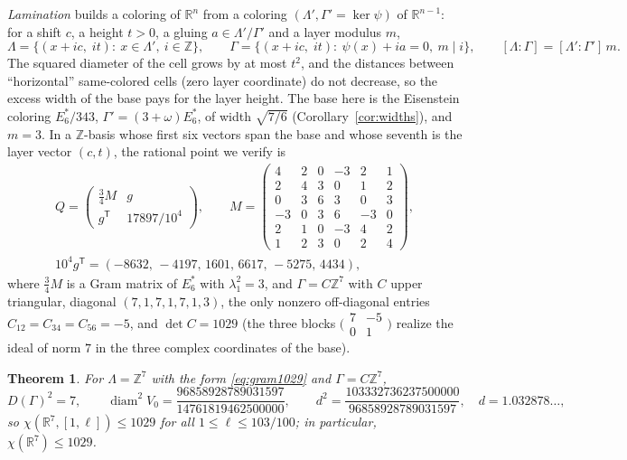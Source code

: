 \documentclass[10pt]{article}
\theoremstyle{plain}
\newtheorem{theorem}{Theorem}[section]
\theoremstyle{remark}
\newcommand{\R}{\mathbb{R}}
\newcommand{\Z}{\mathbb{Z}}
\newcommand{\diam}{\operatorname{diam}}
\begin{document}
\emph{Lamination} builds a coloring of $\R^{n}$ from a coloring
$(\Lambda',\Gamma'=\ker\psi)$ of $\R^{n-1}$: for a shift $c$, a height $t>0$,
a gluing $a\in\Lambda'/\Gamma'$ and a layer modulus $m$,
\[
\Lambda=\bigl\{(x+ic,\;it):\ x\in\Lambda',\ i\in\Z\bigr\},\qquad
\Gamma=\bigl\{(x+ic,\;it):\ \psi(x)+ia=0,\ m\mid i\bigr\},\qquad
[\Lambda:\Gamma]=[\Lambda':\Gamma']\,m .
\]
The squared diameter of the cell grows by at most $t^2$, and the distances
between ``horizontal'' same-colored cells (zero layer coordinate) do not
decrease, so the excess width of the base pays for the layer height. The
base here is the Eisenstein coloring $E_6^*/343$, $\Gamma'=(3+\omega)E_6^*$,
of width $\sqrt{7/6}$ (Corollary~\ref{cor:widths}), and $m=3$. In a
$\Z$-basis whose first six vectors span the base and whose seventh is the
layer vector $(c,t)$, the rational point we verify is
\begin{equation}\label{eq:gram1029}
\begin{gathered}
Q=\begin{pmatrix}\tfrac34M&g\\ g^{\mathsf T}&17897/10^4\end{pmatrix},\qquad
M=\begin{pmatrix}
4&2&0&-3&2&1\\ 2&4&3&0&1&2\\ 0&3&6&3&0&3\\
-3&0&3&6&-3&0\\ 2&1&0&-3&4&2\\ 1&2&3&0&2&4
\end{pmatrix},\\[3pt]
10^4g^{\mathsf T}=(-8632,\,-4197,\,1601,\,6617,\,-5275,\,4434),
\end{gathered}
\end{equation}
where $\tfrac34M$ is a Gram matrix of $E_6^*$ with $\lambda_1^2=3$, and
$\Gamma=C\Z^7$ with $C$ upper triangular, diagonal $(7,1,7,1,7,1,3)$, the
only nonzero off-diagonal entries $C_{12}=C_{34}=C_{56}=-5$, and
$\det C=1029$ (the three blocks
$\bigl(\begin{smallmatrix}7&-5\\0&1\end{smallmatrix}\bigr)$ realize the
ideal of norm $7$ in the three complex coordinates of the base).

\begin{theorem}\label{thm:1029}
For $\Lambda=\Z^7$ with the form \eqref{eq:gram1029} and $\Gamma=C\Z^7$,
\[
D(\Gamma)^2=7,\qquad
\diam^2V_0=\frac{96858928789031597}{14761819462500000},\qquad
d^2=\frac{103332736237500000}{96858928789031597},\quad d=1.032878\ldots,
\]
so $\chi(\R^7,[1,\ell])\le1029$ for all $1\le\ell\le103/100$; in particular,
$\chi(\R^7)\le1029$.
\end{theorem}
\end{document}
